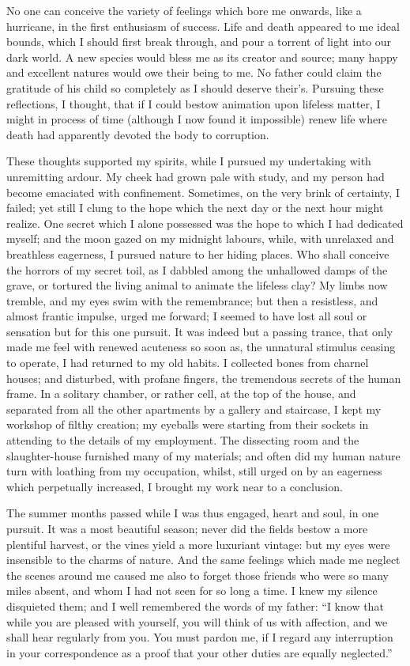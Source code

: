 No one can conceive the variety of
feelings which bore me onwards, like
a hurricane, in the first enthusiasm of
success. Life and death appeared to
me ideal bounds, which I should first
break through, and pour a torrent of
light into our dark world. A new species
would bless me as its creator and
source; many happy and excellent natures
would owe their being to me. No
father could claim the gratitude of his
child so completely as I should deserve
their's. Pursuing these reflections, I
thought, that if I could bestow animation
upon lifeless matter, I might in
process of time (although I now found
it impossible) renew life where death
had apparently devoted the body to
corruption.

These thoughts supported my spirits,
while I pursued my undertaking with
unremitting ardour. My cheek had
grown pale with study, and my person
had become emaciated with confinement.
Sometimes, on the very brink of certainty,
I failed; yet still I clung to the
hope which the next day or the next
hour might realize. One secret which I
alone possessed was the hope to which
I had dedicated myself; and the moon
gazed on my midnight labours, while,
with unrelaxed and breathless eagerness,
I pursued nature to her hiding places.
Who shall conceive the horrors of my
secret toil, as I dabbled among the unhallowed
damps of the grave, or tortured
the living animal to animate the lifeless
clay? My limbs now tremble, and my
eyes swim with the remembrance; but
then a resistless, and almost frantic impulse,
urged me forward; I seemed to
have lost all soul or sensation but for this
one pursuit. It was indeed but a passing trance,
that only made me feel with
renewed acuteness so soon as, the unnatural
stimulus ceasing to operate, I
had returned to my old habits. I
collected bones from charnel houses;
and disturbed, with profane fingers, the
tremendous secrets of the human frame.
In a solitary chamber, or rather cell,
at the top of the house, and separated
from all the other apartments by a
gallery and staircase, I kept my workshop
of filthy creation; my eyeballs
were starting from their sockets in attending
to the details of my employment.
The dissecting room and the
slaughter-house furnished many of my materials;
and often did my human nature
turn with loathing from my occupation,
whilst, still urged on by an eagerness
which perpetually increased,
I brought my work near to a conclusion.

The summer months passed while I
was thus engaged, heart and soul, in
one pursuit. It was a most beautiful
season; never did the fields bestow a
more plentiful harvest, or the vines
yield a more luxuriant vintage: but
my eyes were insensible to the charms
of nature. And the same feelings which
made me neglect the scenes around
me caused me also to forget those
friends who were so many miles absent,
and whom I had not seen for so long a
time. I knew my silence disquieted
them; and I well remembered the words
of my father: ``I know that while you
are pleased with yourself, you will
think of us with affection, and we shall
hear regularly from you. You must
pardon me, if I regard any interruption
in your correspondence as a proof
that your other duties are equally neglected.''

